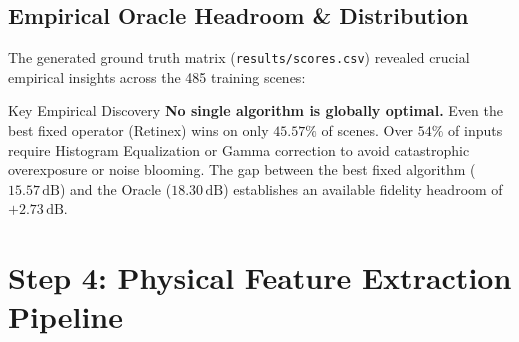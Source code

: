 \documentclass[10pt,a4paper]{article}
\begin{document}
\subsection{Empirical Oracle Headroom \& Distribution}
The generated ground truth matrix (\texttt{results/scores.csv}) revealed crucial empirical insights across the 485 training scenes:

\begin{table}[ht!]
\centering
\small
{}
\end{table}

\begin{alertbox}{Key Empirical Discovery}
\textbf{No single algorithm is globally optimal.} Even the best fixed operator (Retinex) wins on only $45.57\%$ of scenes. Over $54\%$ of inputs require Histogram Equalization or Gamma correction to avoid catastrophic overexposure or noise blooming. The gap between the best fixed algorithm ($15.57\,\text{dB}$) and the Oracle ($18.30\,\text{dB}$) establishes an available fidelity headroom of \textbf{$+2.73\,\text{dB}$}.
\end{alertbox}

\section{Step 4: Physical Feature Extraction Pipeline}
\end{document}
